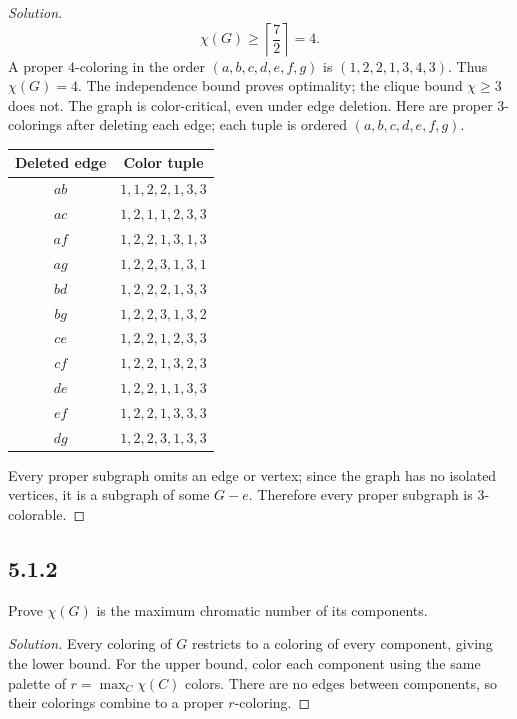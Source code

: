 \documentclass[12pt]{amsart}
\newenvironment{solution}{\begin{proof}[Solution]}{\end{proof}}
\begin{document}
\begin{solution}
        \[
            \chi(G)\ge\left\lceil\frac{7}{2}\right\rceil=4.
        \]
        A proper $4$-coloring in the order $(a,b,c,d,e,f,g)$ is $(1,2,2,1,3,4,3)$. Thus $\chi(G)=4$. The independence bound proves optimality; the clique bound $\chi\ge3$ does not.
        The graph is color-critical, even under edge deletion. Here are proper $3$-colorings after deleting each edge; each tuple is ordered $(a,b,c,d,e,f,g)$.
        \begin{center}\begin{tabular}{cc}\toprule Deleted edge & Color tuple\\\midrule
            $ab$ & $1,1,2,2,1,3,3$\\
            $ac$ & $1,2,1,1,2,3,3$\\
            $af$ & $1,2,2,1,3,1,3$\\
            $ag$ & $1,2,2,3,1,3,1$\\
            $bd$ & $1,2,2,2,1,3,3$\\
            $bg$ & $1,2,2,3,1,3,2$\\
            $ce$ & $1,2,2,1,2,3,3$\\
            $cf$ & $1,2,2,1,3,2,3$\\
            $de$ & $1,2,2,1,1,3,3$\\
            $ef$ & $1,2,2,1,3,3,3$\\
            $dg$ & $1,2,2,3,1,3,3$\\
            \bottomrule\end{tabular}\end{center}
        Every proper subgraph omits an edge or vertex; since the graph has no isolated vertices, it is a subgraph of some $G-e$. Therefore every proper subgraph is $3$-colorable.\end{solution}

    \subsection*{5.1.2} Prove $\chi(G)$ is the maximum chromatic number of its components.
    \begin{solution}Every coloring of $G$ restricts to a coloring of every component, giving the lower bound. For the upper bound, color each component using the same palette of $r=\max_C\chi(C)$ colors. There are no edges between components, so their colorings combine to a proper $r$-coloring.\end{solution}
\end{document}
